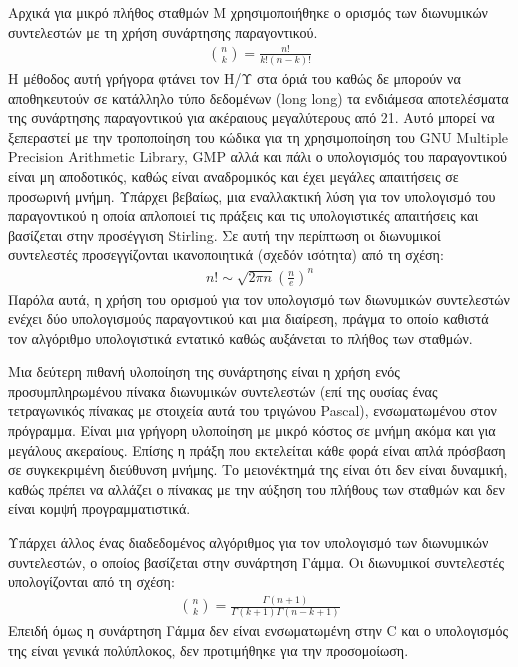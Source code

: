 \documentclass[12pt]{report}
\begin{document}
Αρχικά για μικρό πλήθος σταθμών \textlatin{M} χρησιμοποιήθηκε ο ορισμός των διωνυμικών συντελεστών με τη χρήση συνάρτησης παραγοντικού.
\begin{align*}
  \binom{n}{k}=\frac {n!}{k!(n-k)!}
\end{align*}
Η μέθοδος αυτή γρήγορα φτάνει τον Η/Υ στα όριά του καθώς δε μπορούν να αποθηκευτούν σε κατάλληλο τύπο δεδομένων (\textlatin{long long}) τα ενδιάμεσα αποτελέσματα της συνάρτησης παραγοντικού για ακέραιους μεγαλύτερους από 21. Αυτό μπορεί να ξεπεραστεί με την τροποποίηση του κώδικα για τη χρησιμοποίηση του \textlatin{GNU Multiple Precision Arithmetic Library, GMP} αλλά και πάλι ο υπολογισμός του παραγοντικού είναι μη αποδοτικός, καθώς είναι αναδρομικός και έχει μεγάλες απαιτήσεις σε προσωρινή μνήμη. Υπάρχει βεβαίως, μια εναλλακτική λύση για τον υπολογισμό του παραγοντικού η οποία απλοποιεί τις πράξεις και τις υπολογιστικές απαιτήσεις και βασίζεται στην προσέγγιση \textlatin{Stirling}. Σε αυτή την περίπτωση οι διωνυμικοί συντελεστές προσεγγίζονται ικανοποιητικά (σχεδόν ισότητα) από τη σχέση:
\begin{align*}
  n!\sim\sqrt{2\pi n}\left(\frac{n}{e}\right)^{n}
\end{align*}
Παρόλα αυτά, η χρήση του ορισμού για τον υπολογισμό των διωνυμικών συντελεστών ενέχει δύο υπολογισμούς παραγοντικού και μια διαίρεση, πράγμα το οποίο καθιστά τον αλγόριθμο υπολογιστικά εντατικό καθώς αυξάνεται το πλήθος των σταθμών.

Μια δεύτερη πιθανή υλοποίηση της συνάρτησης είναι η χρήση ενός προσυμπληρωμένου πίνακα διωνυμικών συντελεστών (επί της ουσίας ένας τετραγωνικός πίνακας με στοιχεία αυτά του τριγώνου \textlatin{Pascal}), ενσωματωμένου στον πρόγραμμα. Είναι μια γρήγορη υλοποίηση με μικρό κόστος σε μνήμη ακόμα και για μεγάλους ακεραίους. Επίσης η πράξη που εκτελείται κάθε φορά είναι απλά πρόσβαση σε συγκεκριμένη διεύθυνση μνήμης. Το μειονέκτημά της είναι ότι δεν είναι δυναμική, καθώς πρέπει να αλλάζει ο πίνακας με την αύξηση του πλήθους των σταθμών και δεν είναι κομψή προγραμματιστικά.

Υπάρχει άλλος ένας διαδεδομένος αλγόριθμος για τον υπολογισμό των διωνυμικών συντελεστών, ο οποίος βασίζεται στην συνάρτηση Γάμμα. Οι διωνυμικοί συντελεστές υπολογίζονται από τη σχέση:
\begin{align*}
  \binom{n}{k}={\frac {\Gamma (n+1)}{\Gamma (k+1)\Gamma (n-k+1)}}
\end{align*}
Επειδή όμως η συνάρτηση Γάμμα δεν είναι ενσωματωμένη στην \textlatin{C} και ο υπολογισμός της είναι γενικά πολύπλοκος, δεν προτιμήθηκε για την προσομοίωση.
\end{document}

